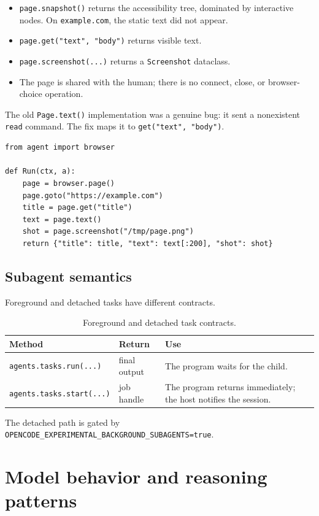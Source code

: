\documentclass[11pt]{article}
\newcommand{\code}[1]{\texttt{#1}}
\begin{document}
\begin{itemize}[leftmargin=1.5em]
\item \code{page.snapshot()} returns the accessibility tree, dominated by
interactive nodes.  On \code{example.com}, the static text did not appear.
\item \code{page.get("text", "body")} returns visible text.
\item \code{page.screenshot(...)} returns a \code{Screenshot} dataclass.
\item The page is shared with the human; there is no connect, close, or
browser-choice operation.
\end{itemize}

The old \code{Page.text()} implementation was a genuine bug: it sent a
nonexistent \code{read} command.  The fix maps it to
\code{get("text", "body")}.

\begin{lstlisting}[style=python]
from agent import browser

def Run(ctx, a):
    page = browser.page()
    page.goto("https://example.com")
    title = page.get("title")
    text = page.text()
    shot = page.screenshot("/tmp/page.png")
    return {"title": title, "text": text[:200], "shot": shot}
\end{lstlisting}

\subsection{Subagent semantics}

Foreground and detached tasks have different contracts.

\begin{table}[h]
\centering
\small
\begin{tabular}{p{2.8cm}p{4.6cm}p{5.6cm}}
\toprule
\textbf{Method} & \textbf{Return} & \textbf{Use} \\
\midrule
\code{agents.tasks.run(...)} & final output & The program waits for the child. \\
\code{agents.tasks.start(...)} & job handle & The program returns immediately; the host notifies the session. \\
\bottomrule
\end{tabular}
\caption{Foreground and detached task contracts.}
\end{table}

The detached path is gated by
\code{OPENCODE\_EXPERIMENTAL\_BACKGROUND\_SUBAGENTS=true}.

\section{Model behavior and reasoning patterns}
\end{document}
